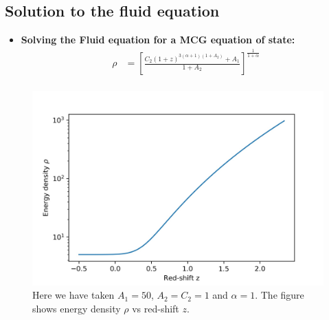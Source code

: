 \documentclass[8pt,hideothersubsections]{beamer}
\newcommand{\brac}[1]{\left(#1\right)}
\newcommand{\bracc}[1]{\left[#1\right]}
\begin{document}
\subsection{Solution to the fluid equation}
\begin{frame}
\begin{itemize}
\fontsize{8pt}{7.2}\selectfont
\frametitle{\insertsectionhead}
\framesubtitle{\insertsubsectionhead}

\item \textbf{Solving the Fluid equation for a MCG equation of state:}
\begin{equation}\label{eq:FMCGZ}
\begin{split}
\rho  &= \bracc{\frac{C_{2}\brac{1+z}^{3\brac{\alpha+1}\brac{1+A_{2}}}+A_{1}}{1+A_{2}}}^{\frac{1}{1+\alpha}} \\
\end{split}
\end{equation}

\end{itemize}
\begin{figure}[h]
\centering
\includegraphics[scale=0.45]{Images/ch_rho.jpg}
\caption{Here we have taken $A_{1}=50$, $A_{2}=C_{2}=1$ and $\alpha=1$. The figure shows energy density $\rho$ vs red-shift $z$.}
\label{fig:ChRho}
\end{figure}
\end{frame}
\end{document}
